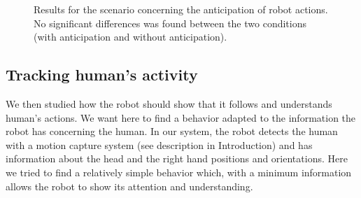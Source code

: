 \documentclass[english,a4paper,11pt,twoside]{StyleThese}
\begin{document}
\begin{figure}[!t]
\centering
	\hfill
    \caption{Results for the scenario concerning the anticipation of robot actions. No significant differences was found between the two conditions (with anticipation and without anticipation).}
    \label{fig:resSce1}
\end{figure}



\subsection{Tracking human's activity}

We then studied how the robot should show that it follows and understands human's actions. We want here to find a behavior adapted to the information the robot has concerning the human. In our system, the robot detects the human with a motion capture system (see description in Introduction) and has information about the head and the right hand positions and orientations. Here we tried to find a relatively simple behavior which, with a minimum information allows the robot to show its attention and understanding. 
\end{document}
